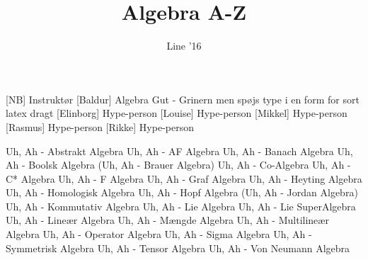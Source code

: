 \documentclass[a4paper,11pt]{article}
\title{Algebra A-Z}
\author{Line '16}
\begin{document}
\maketitle

\begin{roles}
[NB] Instruktør
[Baldur] Algebra Gut - Grinern men spøjs type i en form for sort latex dragt
[Elinborg] Hype-person
[Louise] Hype-person
[Mikkel] Hype-person
[Rasmus] Hype-person
[Rikke] Hype-person
\end{roles}

\begin{song}

 Uh, Ah - Abstrakt Algebra
Uh, Ah - AF Algebra
Uh, Ah - Banach Algebra
Uh, Ah - Boolsk Algebra
(Uh, Ah - Brauer Algebra)
Uh, Ah - Co-Algebra
Uh, Ah - C* Algebra
Uh, Ah - F Algebra
Uh, Ah - Graf Algebra
Uh, Ah - Heyting Algebra
Uh, Ah - Homologisk Algebra
Uh, Ah - Hopf Algebra
(Uh, Ah - Jordan Algebra)
Uh, Ah - Kommutativ Algebra
Uh, Ah - Lie Algebra
Uh, Ah - Lie SuperAlgebra
Uh, Ah - Lineær Algebra
Uh, Ah - Mængde Algebra
Uh, Ah - Multilineær Algebra
Uh, Ah - Operator Algebra
Uh, Ah - Sigma Algebra
Uh, Ah - Symmetrisk Algebra
Uh, Ah - Tensor Algebra
Uh, Ah - Von Neumann Algebra
\end{song}
\end{document}
